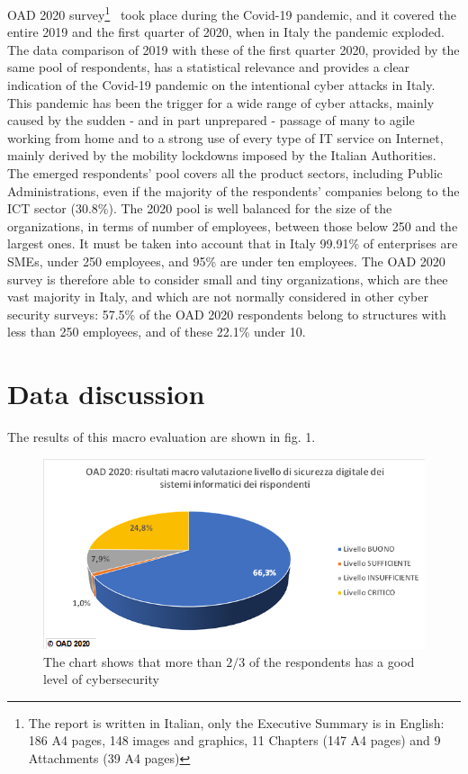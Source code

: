 \documentclass{easychair}
\begin{document}
OAD 2020 survey\footnote{The report is written in Italian, only the Executive Summary is in English: 186 A4 pages, 148 images and graphics, 11 Chapters
(147 A4 pages) and 9 Attachments (39 A4 pages)}~\cite{oad20} took place during the Covid-19 pandemic, and it covered the entire 2019 and the first quarter 
of 2020, when in Italy the pandemic exploded. The data comparison of 2019 with these of the first quarter 2020, provided by the same pool of respondents, has a statistical relevance and provides a 
clear indication of the Covid-19 pandemic on the intentional cyber attacks in Italy. This pandemic has been the trigger for a wide range of cyber attacks, mainly 
caused by the sudden - and in part unprepared - passage of many to agile working from home and to a strong use of every type of IT service on Internet, mainly
derived by the mobility lockdowns imposed by the Italian Authorities. The emerged respondents’ pool covers all the product sectors, including Public Administrations,
even if the majority of the respondents’ companies belong to the ICT sector (30.8\%). The 2020 pool  is well balanced for the size of the organizations, in terms
of number of employees, between those below 250 and the largest ones. It must be taken into account that in Italy 99.91\% \cite{istat20} %
of enterprises are SMEs, under 250 employees, and 95\% are under ten employees. The OAD 2020 survey is therefore able to consider small and 
tiny organizations, which are thee vast majority in Italy, and which are not normally considered in other cyber security surveys: 57.5\% of the OAD 2020 respondents
belong to structures with less than 250 employees, and of these 22.1\% under 10. 

\section{Data discussion}\label{sec:DataDiscussion}


The results of this macro evaluation are shown in fig. 1.


\begin{figure}
	\centering
		\includegraphics[width=1\textwidth]{pictures/fig1.png}
		\caption{The chart shows that more than $ 2/3 $ of the respondents has a good level of cybersecurity}
		\label{fig:1}
\end{figure}
\end{document}
